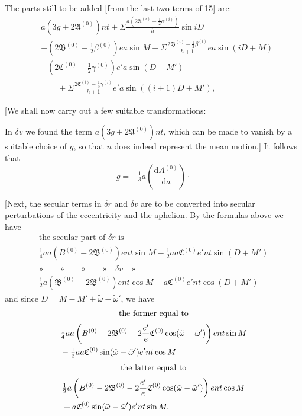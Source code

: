 The parts still to be added [from the last two terms of 15] are:
\hypertarget{native-396}{}
\[
\begin{aligned}
&a(3g+2\mathfrak A^{(0)})nt+\Sigma\frac{a(2\mathfrak A^{(i)}-\tfrac12\alpha^{(i)})}h\sin iD\\
&+(2\mathfrak B^{(0)}-\tfrac12\beta^{(0)})ea\sin M+\Sigma\frac{2\mathfrak B^{(i)}-\tfrac12\beta^{(i)}}{h+1}ea\sin(iD+M)\\
&+(2\mathfrak C^{(0)}-\tfrac12\gamma^{(0)})e'a\sin(D+M')\\
&\qquad+\Sigma\frac{2\mathfrak C^{(i)}-\tfrac12\gamma^{(i)}}{h+1}e'a\sin((i+1)D+M'),
\end{aligned}
\]

[We shall now carry out a few suitable transformations:

In \(\delta v\) we found the term \(a(3g+2\mathfrak A^{(0)})nt\), which can be made to vanish by a suitable choice of \(g\), so that \(n\) does indeed represent the mean motion.] It follows that
\[g=-\tfrac13a\left(\frac{\mathrm{d}A^{(0)}}{\mathrm{d}a}\right)\mathpunct{\cdot}\]

[Next, the secular terms in \(\delta r\) and \(\delta v\) are to be converted into secular perturbations of the eccentricity and the aphelion. By the formulas above we have
\[
\begin{gathered}
\text{the secular part of }\delta r\text{ is}\\[.5ex]
\tfrac14aa(B^{(0)}-2\mathfrak B^{(0)})ent\sin M-\tfrac12aa\mathfrak C^{(0)}e'nt\sin(D+M')\\[1ex]
\text{»}\qquad\text{»}\qquad\text{»}\qquad\text{»}\quad\delta v\quad\text{»}\\[.5ex]
\tfrac12a(\mathfrak B^{(0)}-2\mathfrak B^{(0)})ent\cos M-a\mathfrak C^{(0)}e'nt\cos(D+M')
\end{gathered}
\]
\noindent and since \(D=M-M'+\tilde\omega-\tilde\omega'\), we have
\[
\begin{gathered}
\text{the former equal to}\\[.5ex]
\begin{aligned}
&\tfrac14aa\left(B^{(0)}-2\mathfrak B^{(0)}-2\frac{e'}e\mathfrak C^{(0)}\cos(\tilde\omega-\tilde\omega')\right)ent\sin M\\
&\hfill-\tfrac12aa\mathfrak C^{(0)}\sin(\tilde\omega-\tilde\omega')e'nt\cos M
\end{aligned}
\end{gathered}
\]
\[
\begin{gathered}
\text{the latter equal to}\\[.5ex]
\begin{aligned}
&\tfrac12a\left(B^{(0)}-2\mathfrak B^{(0)}-2\frac{e'}e\mathfrak C^{(0)}\cos(\tilde\omega-\tilde\omega')\right)ent\cos M\\
&\hfill+a\mathfrak C^{(0)}\sin(\tilde\omega-\tilde\omega')e'nt\sin M.
\end{aligned}
\end{gathered}
\]

